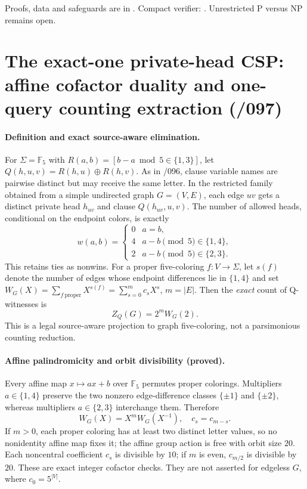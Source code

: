 \documentclass[11pt]{article}
\begin{document}
Proofs, data and safeguards are in
.
Compact verifier:
.
Unrestricted P versus NP remains open.

\section{The exact-one private-head CSP: affine cofactor duality and one-query counting extraction (/097)}

\paragraph{Definition and exact source-aware elimination.}
For $\Sigma=\mathbb F_5$ with $R(a,b)=[b-a\bmod5\in\{1,3\}]$,
let $Q(h,u,v)=R(h,u)\oplus R(h,v)$.
As in /096, clause variable names are pairwise distinct but may
receive the same letter. In the restricted family obtained from a
simple undirected graph $G=(V,E)$, each edge $uv$ gets a distinct
private head $h_{uv}$ and clause $Q(h_{uv},u,v)$.
The number of allowed heads, conditional on the endpoint colors,
is exactly
\[
 w(a,b)=
 \begin{cases}
 0& a=b,\\
 4& a-b\pmod5\in\{1,4\},\\
 2& a-b\pmod5\in\{2,3\}.
 \end{cases}
\]
This retains ties as nonwins. For a proper five-coloring
$f:V\to\Sigma$, let $s(f)$ denote the number of edges whose
endpoint differences lie in $\{1,4\}$ and set
$W_G(X)=\sum_{f\ \mathrm{proper}}X^{s(f)}
=\sum_{s=0}^m c_s X^s$, $m=|E|$.
Then the \emph{exact} count of Q-witnesses is
\[
 Z_Q(G)=2^m W_G(2).
\]
This is a legal source-aware projection to graph five-coloring,
not a parsimonious counting reduction.

\paragraph{Affine palindromicity and orbit divisibility (proved).}
Every affine map $x\mapsto ax+b$ over $\mathbb F_5$ permutes
proper colorings. Multipliers $a\in\{1,4\}$ preserve the
two nonzero edge-difference classes $\{\pm1\}$ and $\{\pm2\}$,
whereas multipliers $a\in\{2,3\}$ interchange them.
Therefore
\[
 \boxed{W_G(X)=X^mW_G(X^{-1}),\quad c_s=c_{m-s}.}
\]
If $m>0$, each proper coloring has at least two distinct letter
values, so no nonidentity affine map fixes it; the affine
group action is free with orbit size $20$. Each noncentral
coefficient $c_s$ is divisible by $10$; if $m$ is even,
$c_{m/2}$ is divisible by $20$. These are exact integer
cofactor checks. They are not asserted for edgeless $G$,
where $c_0=5^{|V|}$.
\end{document}
